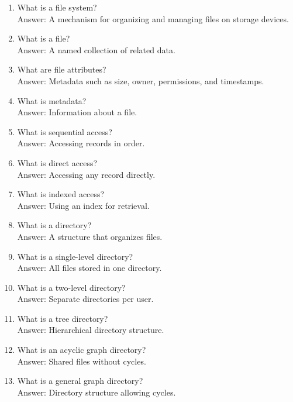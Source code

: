 \begin{enumerate}
\item What is a file system?\\
Answer: A mechanism for organizing and managing files on storage devices.

\item What is a file?\\
Answer: A named collection of related data.

\item What are file attributes?\\
Answer: Metadata such as size, owner, permissions, and timestamps.

\item What is metadata?\\
Answer: Information about a file.

\item What is sequential access?\\
Answer: Accessing records in order.

\item What is direct access?\\
Answer: Accessing any record directly.

\item What is indexed access?\\
Answer: Using an index for retrieval.

\item What is a directory?\\
Answer: A structure that organizes files.

\item What is a single-level directory?\\
Answer: All files stored in one directory.

\item What is a two-level directory?\\
Answer: Separate directories per user.

\item What is a tree directory?\\
Answer: Hierarchical directory structure.

\item What is an acyclic graph directory?\\
Answer: Shared files without cycles.

\item What is a general graph directory?\\
Answer: Directory structure allowing cycles.


\end{enumerate}
